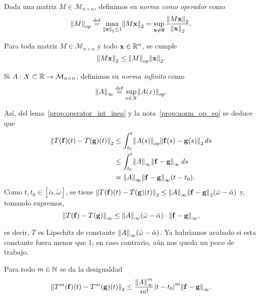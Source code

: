 \documentclass[../ecuaciones_diferenciales.tex]{subfiles}
\begin{document}
\begin{definition}
	Dada una matriz \(M \in \mathcal{M}_{n \times n}\), definimos su \emph{norma
	como operador} como
	\[\norm{M}_{op} \eqdef \max_{\norm{\vec{x}}_2 \leq 1} \norm{M \vec{x}}_2
		= \sup_{\vec{x} \neq \vec{0}}
			\frac{\norm{M \vec{x}}_2}{\norm{\vec{x}}_2}.\]
\end{definition}

\begin{remark}\label{prop:norm_op_eq}
	Para toda matriz \(M \in \mathcal{M}_{n \times n}\) y todo
	\(\mathbf{x} \in \mathbb{R}^n\), se cumple
	\[\norm{M \vec{x}}_2 \leq \norm{M}_{op} \norm{\vec{x}}_2.\]
\end{remark}

\begin{definition}
	Si \(A : X \subset \mathbb{R} \to \mathcal{M}_{n \times n}\), definimos su \emph{norma
	infinito} como
	\[\norm{A}_\infty \eqdef \sup_{x \in X} \norm{A(x)}_{op}.\]
\end{definition}

Así, del lema~\ref{prop:operator_int_ineq} y la nota~\ref{prop:norm_op_eq} se
deduce que
\begin{align*}
	\norm{T(\vec{f})(t) - T(\vec{g})(t)}_2
	&\leq \int_{t_0}^t \norm{A(s)}_{op} \norm{\vec{f}(s) - \vec{g}(s)}_2 \dif s
	\\
	&\leq \int_{t_0}^t \norm{A}_\infty \norm{\vec{f} - \vec{g}}_\infty \dif s \\
	&= \norm{A}_\infty\norm{\vec{f} - \vec{g}}_\infty(t - t_0).
\end{align*}
Como \(t, t_0 \in [\tilde{\alpha}, \tilde{\omega}]\), se tiene
\(\norm{T(\vec{f})(t) - T(\vec{g})(t)}_2
	\leq \norm{A}_\infty\norm{\vec{f} - \vec{g}}_2
		(\tilde{\omega} - \tilde{\alpha})\) y, tomando supremos,
\[\norm{T(\vec{f}) - T(\vec{g})}_\infty
	\leq \norm{A}_\infty(\tilde{\omega}
	- \tilde{\alpha}) \cdot \norm{\vec{f} - \vec{g}}_\infty,\]

es decir, \(T\) es Lipschitz de constante
\(\norm{A}_\infty(\tilde{\omega}-\tilde{\alpha})\). Ya habríamos acabado si esta
constante fuera menor que 1; en caso contrario, aún nos queda un poco de
trabajo.

\begin{lemma}\label{lem:desinfty}
	Para todo \(m \in \mathbb{N}\) se da la desigualdad
	\[\norm{T^m(\vec{f})(t) - T^m(\vec{g})(t)}_2
		\leq \frac{\norm{A}^m_\infty}{m!} \abs{t - t_0}^m
			\norm{\vec{f} - \vec{g}}_\infty.\]
\end{lemma}
\end{document}
